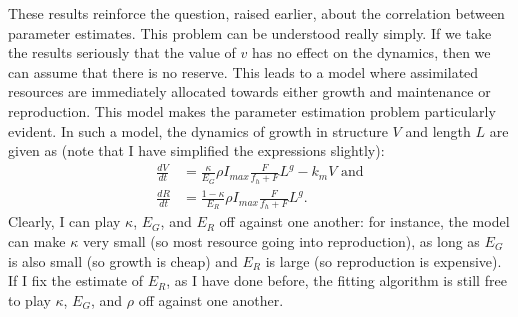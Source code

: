 \documentclass[12pt,reqno,final,pdftex]{amsart}\usepackage[]{graphicx}\usepackage[]{color}
\theoremstyle{plain}
\numberwithin{equation}{part}
\begin{document}
These results reinforce the question, raised earlier, about the correlation between parameter estimates.
This problem can be understood really simply.
If we take the results seriously that the value of $v$ has no effect on the dynamics, then we can assume that there is no reserve.
This leads to a model where assimilated resources are immediately allocated towards either growth and maintenance or reproduction.
This model makes the parameter estimation problem particularly evident.
In such a model, the dynamics of growth in structure $V$ and length $L$ are given as (note that I have simplified the expressions slightly):
\begin{align}
\frac{dV}{dt} &= \frac{\kappa}{E_G} \rho I_{max} \frac{F}{f_h+F} L^g - k_m V \text{ and} \\
\frac{dR}{dt} &= \frac{1-\kappa}{E_R} \rho I_{max} \frac{F}{f_h+F} L^g.
\end{align}
Clearly, I can play $\kappa$, $E_G$, and $E_R$ off against one another: for instance, the model can make $\kappa$ very small (so most resource going into reproduction), as long as $E_G$ is also small (so growth is cheap) and $E_R$ is large (so reproduction is expensive).
If I fix the estimate of $E_R$, as I have done before, the fitting algorithm is still free to play $\kappa$, $E_G$, and $\rho$ off against one another.
\end{document}
